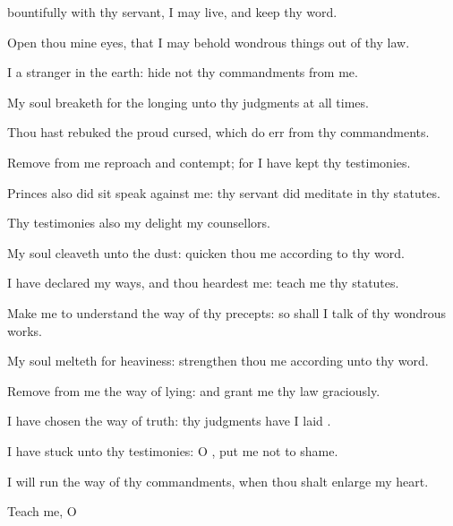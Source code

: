 {bountifully with thy
servant,
{} I may
live, and
keep thy
word.
\par }{\Q {}Open thou mine
eyes, that I may
behold wondrous
things out of thy
law.
\par }{\Q {}I
{} a
stranger in the
earth:
hide not thy
commandments from me.
\par }{\Q {}My
soul
breaketh for the
longing
{} unto thy
judgments at all
times.
\par }{\Q {}Thou hast
rebuked the
proud
{}
cursed, which do
err from thy
commandments.
\par }{\Q {}Remove from me
reproach and
contempt; for I have
kept thy
testimonies.
\par }{\Q {}Princes also did
sit
{}
speak against me:
{} thy
servant did
meditate in thy
statutes.
\par }{\Q {}Thy
testimonies also
{} my
delight
{} my
counsellors.
\par }{
\par }{\Q {}My
soul
cleaveth unto the
dust:
quicken thou me according to thy
word.
\par }{\BB \par }{\Q {}I have
declared my
ways, and thou
heardest me:
teach me thy
statutes.
\par }{\Q {}Make me to
understand the
way of thy
precepts: so shall I
talk of thy wondrous
works.
\par }{\BB \par }{\Q {}My
soul
melteth for
heaviness:
strengthen thou me according unto thy
word.
\par }{\Q {}Remove from me the
way of
lying: and grant me thy
law
graciously.
\par }{\BB \par }{\Q {}I have
chosen the
way of
truth: thy
judgments have I
laid
{}.
\par }{\Q {}I have
stuck unto thy
testimonies: O
{}, put me not to
shame.
\par }{\Q {}I will
run the
way of thy
commandments, when thou shalt
enlarge my
heart.
\par }{\BB \par }{
\par }{\Q {}Teach me, O
}
